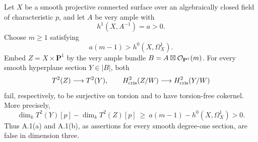 \begin{proposition}
\label{prop:OC-product-integral-counterexample}
Let $X$ be a smooth projective connected surface over an algebraically closed field of characteristic $p$, and let $A$ be very ample with
\[
                    h^1(X,A^{-1})=a>0.
\]
Choose $m\geq1$ satisfying
\[
                       a(m-1)>h^0(X,\Omega_X^1).
\]
Embed $Z=X\times\mathbf P^1$ by the very ample bundle
$B=A\boxtimes\mathcal O_{\mathbf P^1}(m)$.
For every smooth hyperplane section $Y\in|B|$, both
\[
 T^2(Z)\longrightarrow T^2(Y),\qquad
 H^2_{\mathrm{cris}}(Z/W)\longrightarrow H^2_{\mathrm{cris}}(Y/W)
\]
fail, respectively, to be surjective on torsion and to have torsion-free cokernel.  More precisely,
\begin{equation}\label{eq:OC-product-torsion-growth}
 \dim_k T^2(Y)[p]-\dim_k T^2(Z)[p]
    \ \geq\ a(m-1)-h^0(X,\Omega_X^1)>0.
\end{equation}
Thus A.1(a) and A.1(b), as assertions for every smooth degree-one section, are false in dimension three.
\end{proposition}

